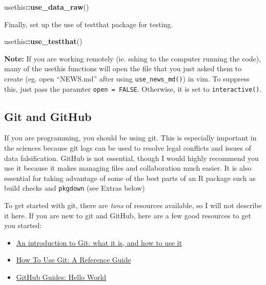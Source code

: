 \documentclass[]{book}
\newenvironment{Shaded}{\begin{snugshade}}{\end{snugshade}}
\newcommand{\KeywordTok}[1]{\textcolor[rgb]{0.13,0.29,0.53}{\textbf{#1}}}
\newcommand{\NormalTok}[1]{#1}
\newcommand{\OperatorTok}[1]{\textcolor[rgb]{0.81,0.36,0.00}{\textbf{#1}}}
\providecommand{\tightlist}{%
  \setlength{\itemsep}{0pt}\setlength{\parskip}{0pt}}
\begin{document}
\begin{Shaded}
\begin{Highlighting}[]
\NormalTok{usethis}\OperatorTok{::}\KeywordTok{use_data_raw}\NormalTok{()}
\end{Highlighting}
\end{Shaded}

Finally, set up the use of testthat package for testing.

\begin{Shaded}
\begin{Highlighting}[]
\NormalTok{usethis}\OperatorTok{::}\KeywordTok{use_testthat}\NormalTok{()}
\end{Highlighting}
\end{Shaded}

\textbf{Note:} If you are working remotely (ie. sshing to the computer running the code), many of the usethis functions will open the file that you just asked them to create (eg. open ``NEWS.md'' after using \texttt{use\_news\_md()}) in vim. To suppress this, just pass the paramter \texttt{open\ =\ FALSE}. Otherwise, it is set to \texttt{interactive()}.

\hypertarget{git-and-github}{%
\subsection{Git and GitHub}\label{git-and-github}}

If you are programming, you should be using git. This is especially important in the sciences because git logs can be used to resolve legal conflicts and issues of data falsification. GitHub is not essential, though I would highly recommend you use it because it makes managing files and collaboration much easier. It is also essential for taking advantage of some of the best parts of an R package such as build checks and \texttt{pkgdown} (see Extras below)

To get started with git, there are \emph{tons} of resources available, so I will not describe it here. If you are new to git and GitHub, here are a few good resources to get you started:

\begin{itemize}
\tightlist
\item
  \href{https://medium.freecodecamp.org/what-is-git-and-how-to-use-it-c341b049ae61}{An introduction to Git: what it is, and how to use it}
\item
  \href{https://www.digitalocean.com/community/tutorials/how-to-use-git-a-reference-guide}{How To Use Git: A Reference Guide}
\item
  \href{https://guides.github.com/activities/hello-world/}{GitHub Guides: Hello World}
\end{itemize}
\end{document}
